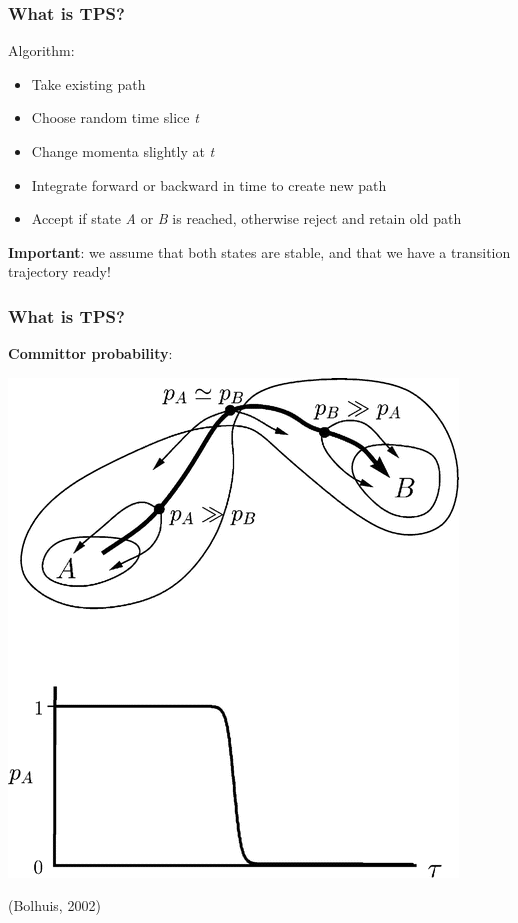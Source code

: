 \documentclass[hyperref={pdfpagelabels=false}]{beamer}
\begin{document}
\begin{frame}
\frametitle{What is TPS?}
Algorithm:
\begin{itemize}
\item Take existing path
\item Choose random time slice \textit{t}
\item Change momenta slightly at \textit{t}
\item Integrate forward or backward in time to create new path
\item Accept if state \textit{A} or \textit{B} is reached, otherwise reject and retain old path
\end{itemize}
\textbf{Important}: we assume that both states are stable, and that we have a transition trajectory ready!
\end{frame}

\begin{frame}
\frametitle{What is TPS?}
\textbf{Committor probability}:
\begin{center}
\includegraphics[scale=0.4]{images/bolhuis1.png}
\end{center}
(Bolhuis, 2002)
\end{frame}
\end{document}
